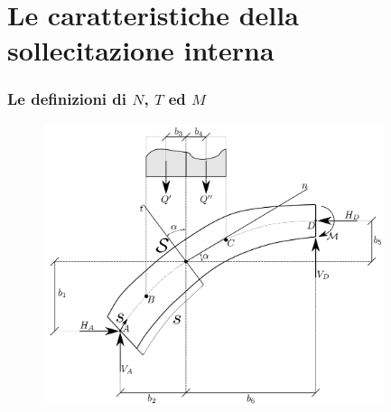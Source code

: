 \clearpage
\pagestyle{fancy}
\part{Le caratteristiche della sollecitazione interna}
\setcounter{section}{0}
\section{Le definizioni di $N$, $T$ ed $M$}
\renewcommand{\thefigure}{11~-~1}
\begin{figure}[ht]
\centering
\includegraphics[width=0.89\textwidth]{Immagini/Parte_11/Figura11_1/figura11_1.pdf}
\caption{}
\label{figura11-1}
\end{figure}
